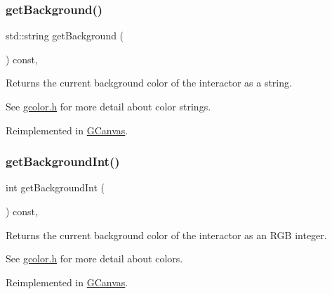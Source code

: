 \mbox{\label{classsgl_1_1GDrawingSurface_a808e22cc1fdfbecf71ed8c64ef4600e0}} 
\subsubsection{\texorpdfstring{get\+Background()}{getBackground()}}
{\footnotesize\ttfamily std\+::string get\+Background (\begin{DoxyParamCaption}{ }\end{DoxyParamCaption}) const\hspace{0.3cm}{\ttfamily [virtual]}, {\ttfamily [inherited]}}



Returns the current background color of the interactor as a string. 

See \mbox{\hyperlink{gcolor_8h_source}{gcolor.\+h}} for more detail about color strings. 

Reimplemented in \mbox{\hyperlink{classsgl_1_1GCanvas_a4a62c51b7244a7642b88065e3a07ae82}{G\+Canvas}}.

\mbox{\label{classsgl_1_1GDrawingSurface_a9e827257a55cb8cf4d9de2ec6bcfd7a0}} 
\subsubsection{\texorpdfstring{get\+Background\+Int()}{getBackgroundInt()}}
{\footnotesize\ttfamily int get\+Background\+Int (\begin{DoxyParamCaption}{ }\end{DoxyParamCaption}) const\hspace{0.3cm}{\ttfamily [virtual]}, {\ttfamily [inherited]}}



Returns the current background color of the interactor as an R\+GB integer. 

See \mbox{\hyperlink{gcolor_8h_source}{gcolor.\+h}} for more detail about colors. 

Reimplemented in \mbox{\hyperlink{classsgl_1_1GCanvas_acd4f2b3b9619dacdfd71fc0004cac382}{G\+Canvas}}.

